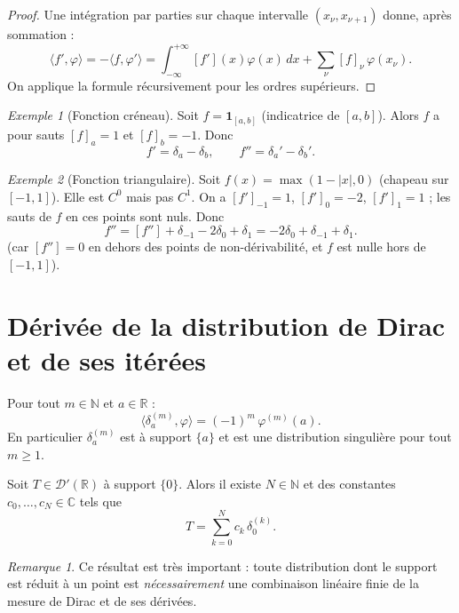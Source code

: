 \documentclass[12pt,a4paper,openany]{book}
\theoremstyle{definition}
\theoremstyle{plain}
\theoremstyle{remark}
\newtheorem*{remark}{Remarque}
\newtheorem*{example}{Exemple}
\newenvironment{remarque}{\begin{remark}}{\end{remark}}
\newenvironment{exemple}{\begin{example}}{\end{example}}
\begin{document}
	\begin{proof}
		Une intégration par parties sur chaque intervalle $(x_\nu, x_{\nu+1})$ donne, après sommation :
		\[
		\langle f', \varphi\rangle = -\langle f, \varphi'\rangle = \int_{-\infty}^{+\infty}[f'](x)\varphi(x)\,dx + \sum_\nu [f]_\nu\,\varphi(x_\nu).
		\]
		On applique la formule récursivement pour les ordres supérieurs.
	\end{proof}
	
	\begin{exemple}[Fonction créneau]
		Soit $f = \mathbf{1}_{[a,b]}$ (indicatrice de $[a,b]$). Alors $f$ a pour sauts $[f]_a = 1$ et $[f]_b = -1$. Donc
		\[
		f' = \delta_a - \delta_b, \qquad f'' = \delta_a' - \delta_b'.
		\]
	\end{exemple}
	
	\begin{exemple}[Fonction triangulaire]
		Soit $f(x) = \max(1 - |x|, 0)$ (chapeau sur $[-1,1]$). Elle est $C^0$ mais pas $C^1$. On a $[f']_{-1} = 1$, $[f']_0 = -2$, $[f']_1 = 1$ ; les sauts de $f$ en ces points sont nuls. Donc
		\[
		f'' = [f''] + \delta_{-1} - 2\delta_0 + \delta_1 = -2\delta_0 + \delta_{-1} + \delta_1.
		\]
		(car $[f''] = 0$ en dehors des points de non-dérivabilité, et $f$ est nulle hors de $[-1,1]$).
	\end{exemple}
	
	\section{Dérivée de la distribution de Dirac et de ses itérées}
	
	\begin{proposition}
		Pour tout $m \in \mathbb{N}$ et $a \in \mathbb{R}$ :
		\[
		\langle \delta_a^{(m)}, \varphi \rangle = (-1)^m\,\varphi^{(m)}(a).
		\]
		En particulier $\delta_a^{(m)}$ est à support $\{a\}$ et est une distribution singulière pour tout $m \geq 1$.
	\end{proposition}
	
	\begin{theorem}
		Soit $T \in \mathcal{D}'(\mathbb{R})$ à support $\{0\}$. Alors il existe $N \in \mathbb{N}$ et des constantes $c_0, \dots, c_N \in \mathbb{C}$ tels que
		\[
		T = \sum_{k=0}^N c_k\,\delta_0^{(k)}.
		\]
	\end{theorem}
	
	\begin{remarque}
		Ce résultat est très important : toute distribution dont le support est réduit à un point est \emph{nécessairement} une combinaison linéaire finie de la mesure de Dirac et de ses dérivées.
	\end{remarque}
	
\end{document}
